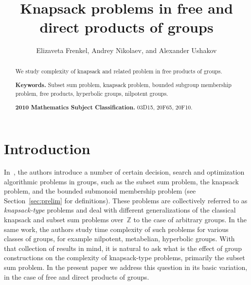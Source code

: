 \documentclass[10pt]{amsart}
\title{Knapsack problems in free and direct products of groups}
\author[]{Elizaveta Frenkel, Andrey Nikolaev, and Alexander Ushakov}
\theoremstyle{definition}
\begin{document}
\begin{abstract}
We study complexity of knapsack and related problem in free products of groups.

\noindent
{\bf Keywords.} Subset sum problem,  knapsack problem, bounded subgroup membership problem, free products, hyperbolic groups, nilpotent groups.

\noindent
{\bf 2010 Mathematics Subject Classification.} 03D15, 20F65, 20F10.
\end{abstract}
\maketitle

\tableofcontents

\section{Introduction}\label{sec:intro}


In~\cite{Miasnikov-Nikolaev-Ushakov:2014a}, the authors introduce a number of certain decision, search and optimization algorithmic problems in groups, such as the subset sum problem, the knapsack problem, and the bounded submonoid membership problem (see Section~\ref{sec:prelim} for definitions). These problems are collectively referred to as {\em knapsack-type} problems and deal with different generalizations of the classical knapsack and subset sum problems over~$\mathbb Z$ to the case of arbitrary groups. In the same work, the authors study time complexity of such problems for various classes of groups, for example nilpotent, metabelian, hyperbolic groups. With that collection of results in mind, it is natural to ask what is the effect of group constructions on the complexity of knapsack-type problems, primarily the subset sum problem. In the present paper we address this question in its basic variation, in the case of free and direct products of groups.
\end{document}
